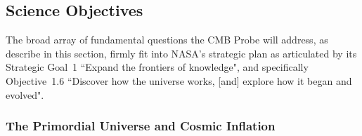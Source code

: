
\subsection{Science Objectives}
\label{sec:science}

\vspace{-0.05in}

The broad array of fundamental questions the CMB Probe will address, as describe in this section, 
firmly fit into NASA's strategic plan as articulated by its Strategic Goal~1 ``Expand the frontiers of knowledge", and 
specifically Objective~1.6 ``Discover how the universe works, [and] explore how it began and evolved".

\vspace{-0.22in}
 
\subsubsection{The Primordial Universe and Cosmic Inflation}

\vspace{-0.05in}


